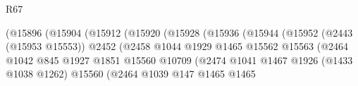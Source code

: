 \begin{lexlean}{R67}
\begin{coremodule}
                                                      (@15896
                                                        (@15904
                                                          (@15912
                                                            (@15920
                                                              (@15928
                                                                (@15936
                                                                  (@15944
                                                                    (@15952
                                                                      (@2443 (@15953 @15553))
                                                                      @2452
                                                                      (@2458
                                                                        @1044
                                                                        @1929
                                                                        @1465
                                                                        @15562
                                                                        @15563
                                                                        (@2464
                                                                          @1042
                                                                          @845
                                                                          @1927
                                                                          @1851
                                                                          @15560
                                                                          @10709
                                                                          (@2474
                                                                            @1041
                                                                            @1467
                                                                            @1926
                                                                            (@1433 @1038 @1262)
                                                                            @15560
                                                                            (@2464
                                                                              @1039
                                                                              @147
                                                                              @1465
                                                                              @1465

\end{coremodule}
\end{lexlean}
